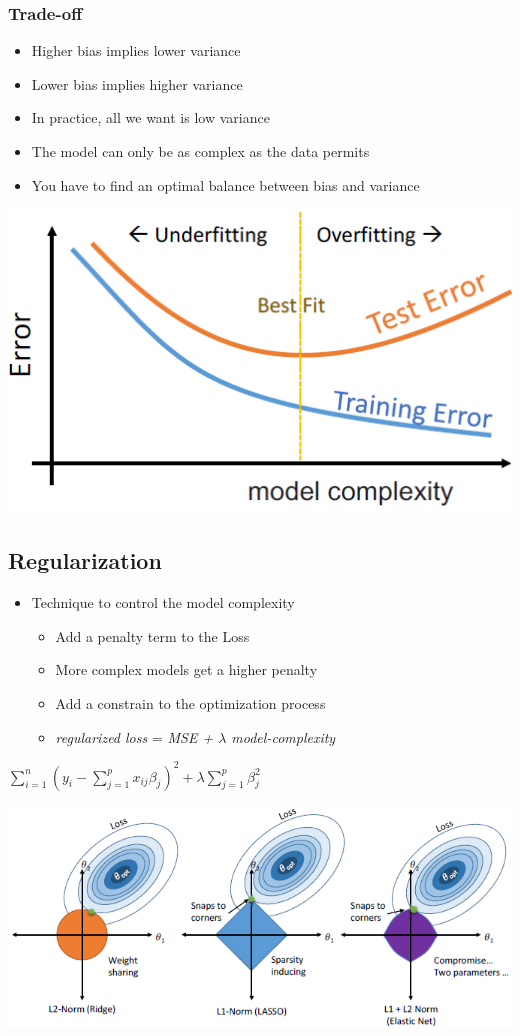 \subsubsection{Trade-off}
\begin{itemize}
    \item Higher bias implies lower variance
    \item Lower bias implies higher variance
    \item In practice, all we want is low variance
    \item The model can only be as complex as the data permits
    \item You have to find an optimal balance between bias and variance
\end{itemize}
\includegraphics[width=0.6\linewidth]{./img/tradeoff.png}

\subsection{Regularization}
\begin{itemize}
    \item Technique to control the model complexity
    \begin{itemize}
        \item Add a penalty term to the Loss
        \item More complex models get a higher penalty
        \item Add a constrain to the optimization process
        \item \textit{regularized loss} = \textit{MSE + $\lambda$ model-complexity}
    \end{itemize}
\end{itemize}
\begin{center}
    $\displaystyle\sum_{i = 1}^{n} (y_i - \displaystyle\sum_{j = 1}^{p} x_{ij}\beta_j)^2 + \lambda \displaystyle\sum_{j = 1}^{p}\beta_j^2$
\end{center}
\includegraphics[width=1\linewidth]{./img/regularization.png}
